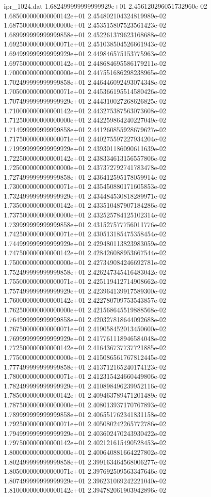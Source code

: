 \begin{filecontents}{ipr_1024.dat}
1.682499999999999929e+01 2.456120296051732960e-02
1.685000000000000142e+01 2.454802104324819989e-02
1.687500000000000000e+01 2.453515807523561423e-02
1.689999999999999858e+01 2.452261379623168688e-02
1.692500000000000071e+01 2.451038504526661943e-02
1.694999999999999929e+01 2.449846575153775963e-02
1.697500000000000142e+01 2.448684695586179211e-02
1.700000000000000000e+01 2.447551686298238965e-02
1.702499999999999858e+01 2.446446092493074348e-02
1.705000000000000071e+01 2.445366195514580426e-02
1.707499999999999929e+01 2.444310027268626825e-02
1.710000000000000142e+01 2.443275387563073608e-02
1.712500000000000000e+01 2.442259864240227049e-02
1.714999999999999858e+01 2.441260855928679627e-02
1.717500000000000071e+01 2.440275597227934204e-02
1.719999999999999929e+01 2.439301186090611639e-02
1.722500000000000142e+01 2.438334613156557806e-02
1.725000000000000000e+01 2.437372792741783478e-02
1.727499999999999858e+01 2.436412595178059914e-02
1.730000000000000071e+01 2.435450880171605853e-02
1.732499999999999929e+01 2.434484530818289971e-02
1.735000000000000142e+01 2.433510487907184286e-02
1.737500000000000000e+01 2.432525784125102314e-02
1.739999999999999858e+01 2.431527577756011776e-02
1.742500000000000071e+01 2.430513185475358454e-02
1.744999999999999929e+01 2.429480113823983059e-02
1.747500000000000142e+01 2.428426088953667544e-02
1.750000000000000000e+01 2.427349084246692781e-02
1.752499999999999858e+01 2.426247345416483042e-02
1.755000000000000071e+01 2.425119412714908662e-02
1.757499999999999929e+01 2.423964139917589300e-02
1.760000000000000142e+01 2.422780709753543857e-02
1.762500000000000000e+01 2.421568645519888568e-02
1.764999999999999858e+01 2.420327818644092688e-02
1.767500000000000071e+01 2.419058452013450600e-02
1.769999999999999929e+01 2.417761118946584048e-02
1.772500000000000142e+01 2.416436737737721885e-02
1.775000000000000000e+01 2.415086561767812445e-02
1.777499999999999858e+01 2.413712165240174123e-02
1.780000000000000071e+01 2.412315424660449806e-02
1.782499999999999929e+01 2.410898496239952116e-02
1.785000000000000142e+01 2.409463789471201489e-02
1.787500000000000000e+01 2.408013937170767893e-02
1.789999999999999858e+01 2.406551762341831158e-02
1.792500000000000071e+01 2.405080242265772786e-02
1.794999999999999929e+01 2.403602470243930422e-02
1.797500000000000142e+01 2.402121615490528453e-02
1.800000000000000000e+01 2.400640881664227802e-02
1.802499999999999858e+01 2.399163464568006277e-02
1.805000000000000071e+01 2.397692509563347646e-02
1.807499999999999929e+01 2.396231069242221040e-02
1.810000000000000142e+01 2.394782061903942896e-02

\end{filecontents}
